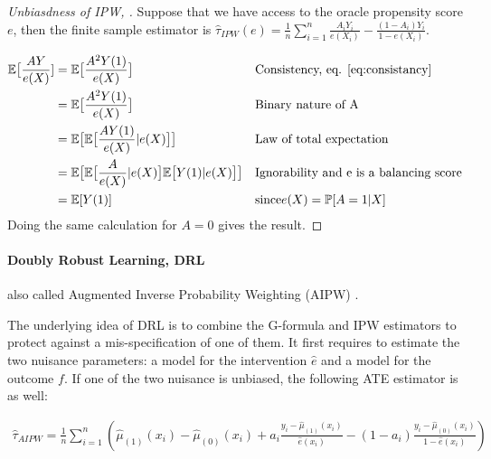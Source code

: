\documentclass[french,12pt,twoside,a4paper]{book}
\newtheorem{proof}{Proof}
\begin{document}
\begin{appendices}
\begin{background_box_left}
\begin{proof}[Unbiasdness of IPW, \citep{rosenbaum_central_1983}]
      Suppose that we have access to the oracle propensity score $e$, then the
      finite sample estimator is $\hat{\tau}_{IPW}(e)=\frac{1}{n} \sum_{i=1}^{n}
        \frac{A_{i} Y_{i}}{e\left(X_{i}\right)}-\frac{(1-A_{i})
        Y_{i}}{1-e\left(X_{i}\right)}$.

      \begin{align*}
        \mathbb E \big[\frac{A Y}{e(X)}] & =\mathbb E \big[\frac{A^2 Y(1)}{e(X)}\big]                                                  &  & \text{Consistency, eq. \ref{eq:consistancy}}   \\
                                         & =\mathbb E \big[\frac{A^2 Y(1)}{e(X)}\big]                                                  &  & \text{Binary nature of A}                      \\
                                         & =\mathbb E \big[\mathbb E \big[\frac{A Y(1)}{e(X)}|e(X)\big]\big]                           &  & \text{Law of total expectation}                \\
                                         & =\mathbb E \big[\mathbb E \big[\frac{A}{e(X)}|e(X)\big] \mathbb E \big[Y(1)|e(X)\big] \big] &  & \text{Ignorability and e is a balancing score} \\
                                         & =\mathbb E[Y(1)]                                                                            &  & \text{since} e(X)=\mathbb P[A=1|X]
      \end{align*}
      Doing the same calculation for $A=0$ gives the result.
    \end{proof}

    \paragraph{Doubly Robust Learning, DRL} also called Augmented Inverse
    Probability Weighting (AIPW) \citep{robins1994estimation}.

    The underlying idea of DRL is to combine the G-formula and IPW estimators to
    protect against a mis-specification of one of them. It first requires to
    estimate the two nuisance parameters: a model for the intervention $\hat{e}$
    and a model for the outcome $f$. If one of the two nuisance is unbiased, the
    following ATE estimator is as well:

    $$\begin{aligned} \widehat{\tau}_{A I P W}=\frac{1}{n}
        \sum_{i=1}^{n}\left(\hat \mu_{(1)}\left(x_{i}\right)-\hat \mu_{(0)}\left(x_{i}\right)+a_{i}
        \frac{y_{i}-\hat \mu_{(1)}\left(x_{i}\right)}{\hat{e}\left(x_{i}\right)}-\left(1-a_{i}\right)
        \frac{y_{i}-\hat \mu_{(0)}\left(x_{i}\right)}{1-\hat{e}\left(x_{i}\right)}\right)
      \end{aligned}$$


\end{background_box_left}
\end{appendices}
\end{document}

